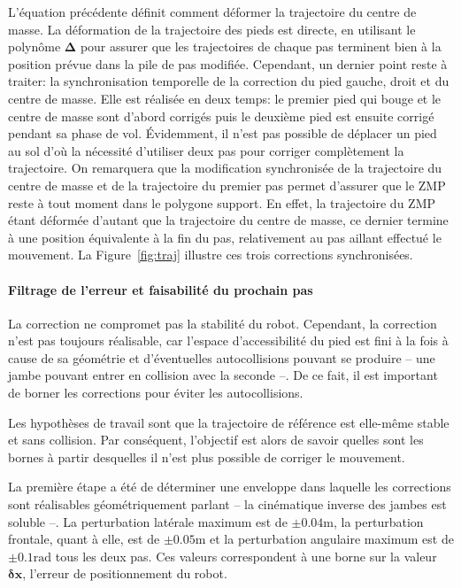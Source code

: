 L'équation précédente définit comment déformer la trajectoire du
centre de masse. La déformation de la trajectoire des pieds est
directe, en utilisant le polynôme $\mathbf{\Delta}$ pour assurer que
les trajectoires de chaque pas terminent bien à la position prévue
dans la pile de pas modifiée. Cependant, un dernier point reste à
traiter: la synchronisation temporelle de la correction du pied
gauche, droit et du centre de masse. Elle est réalisée en deux temps:
le premier pied qui bouge et le centre de masse sont d'abord corrigés
puis le deuxième pied est ensuite corrigé pendant sa phase de
vol. Évidemment, il n'est pas possible de déplacer un pied au sol d'où
la nécessité d'utiliser deux pas pour corriger complètement la
trajectoire. On remarquera que la modification synchronisée de la
trajectoire du centre de masse et de la trajectoire du premier pas
permet d'assurer que le ZMP reste à tout moment dans le polygone
support. En effet, la trajectoire du ZMP étant déformée d'autant que
la trajectoire du centre de masse, ce dernier termine à une position
équivalente à la fin du pas, relativement au pas aillant effectué le
mouvement. La Figure \ref{fig:traj} illustre ces trois corrections
synchronisées.


\paragraph{Filtrage de l'erreur et faisabilité du prochain pas}


La correction ne compromet pas la stabilité du robot. Cependant, la
correction n'est pas toujours réalisable, car l'espace d'accessibilité
du pied est fini à la fois à cause de sa géométrie et d'éventuelles
autocollisions pouvant se produire -- une jambe pouvant entrer en
collision avec la seconde --. De ce fait, il est important de borner
les corrections pour éviter les autocollisions.


Les hypothèses de travail sont que la trajectoire de référence est
elle-même stable et sans collision. Par conséquent, l'objectif est
alors de savoir quelles sont les bornes à partir desquelles il n'est
plus possible de corriger le mouvement.


La première étape a été de déterminer une enveloppe dans laquelle les
corrections sont réalisables géométriquement parlant -- la cinématique
inverse des jambes est soluble --. La perturbation latérale maximum
est de $\pm 0.04 \mathrm{m}$, la perturbation frontale, quant à elle,
est de $\pm 0.05 \mathrm{m}$ et la perturbation angulaire maximum est
de $\pm 0.1 \mathrm{rad}$ tous les deux pas. Ces valeurs correspondent
à une borne sur la valeur $\mathbf{\delta {x}}$, l'erreur de
positionnement du robot.


